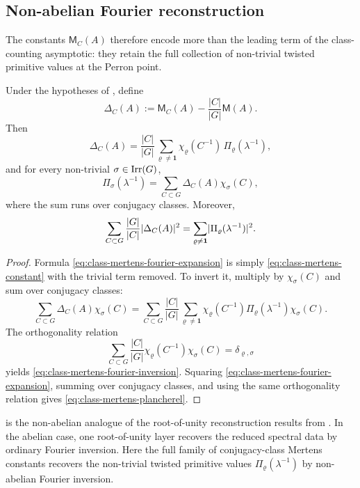 \subsection{Non-abelian Fourier reconstruction}

The constants \(\mathsf M_C(A)\) therefore encode more than the leading
term of the class-counting asymptotic: they retain the full collection
of non-trivial twisted primitive values at the Perron point.

\begin{theorem}
  \label{thm:class-mertens-fourier}
  Under the hypotheses of , define
  \[
    \Delta_C(A)
    :=\mathsf M_C(A)-\frac{|C|}{|G|}\mathsf M(A).
  \]
  Then
  \begin{equation}\label{eq:class-mertens-fourier-expansion}
    \Delta_C(A)
    =
    \frac{|C|}{|G|}
      \sum_{\varrho\neq\mathbf 1}
        \chi_\varrho(C^{-1})\,\Pi_\varrho(\lambda^{-1}),
  \end{equation}
  and for every non-trivial \(\sigma\in\operatorname{Irr}(G)\),
  \begin{equation}\label{eq:class-mertens-fourier-inversion}
    \Pi_\sigma(\lambda^{-1})
    =
    \sum_{C\subset G}\Delta_C(A)\chi_\sigma(C),
  \end{equation}
  where the sum runs over conjugacy classes. Moreover,
  \begin{equation}\label{eq:class-mertens-plancherel}
    \sum_{C\subset G}\frac{|G|}{|C|}\lvert \Delta_C(A) \rvert^2
    =
    \sum_{\varrho\neq\mathbf 1}
      \lvert \Pi_\varrho(\lambda^{-1}) \rvert^2.
  \end{equation}
\end{theorem}

\begin{proof}
  Formula \eqref{eq:class-mertens-fourier-expansion} is simply
  \eqref{eq:class-mertens-constant} with the trivial term removed. To
  invert it, multiply by \(\chi_\sigma(C)\) and sum over conjugacy
  classes:
  \[
    \sum_{C\subset G}\Delta_C(A)\chi_\sigma(C)
    =
    \sum_{C\subset G}\frac{|C|}{|G|}
      \sum_{\varrho\neq\mathbf 1}
        \chi_\varrho(C^{-1})\Pi_\varrho(\lambda^{-1})\chi_\sigma(C).
  \]
  The orthogonality relation
  \[
    \sum_{C\subset G}\frac{|C|}{|G|}
      \chi_\varrho(C^{-1})\chi_\sigma(C)
    =\delta_{\varrho,\sigma}
  \]
  yields \eqref{eq:class-mertens-fourier-inversion}. Squaring
  \eqref{eq:class-mertens-fourier-expansion}, summing over conjugacy
  classes, and using the same orthogonality relation gives
  \eqref{eq:class-mertens-plancherel}.
\end{proof}

\begin{remark}
   is the non-abelian analogue of the
  root-of-unity reconstruction results from . In
  the abelian case, one root-of-unity layer recovers the reduced
  spectral data by ordinary Fourier inversion. Here the full family of
  conjugacy-class Mertens constants recovers the non-trivial twisted
  primitive values \(\Pi_\varrho(\lambda^{-1})\) by non-abelian Fourier
  inversion.
\end{remark}
